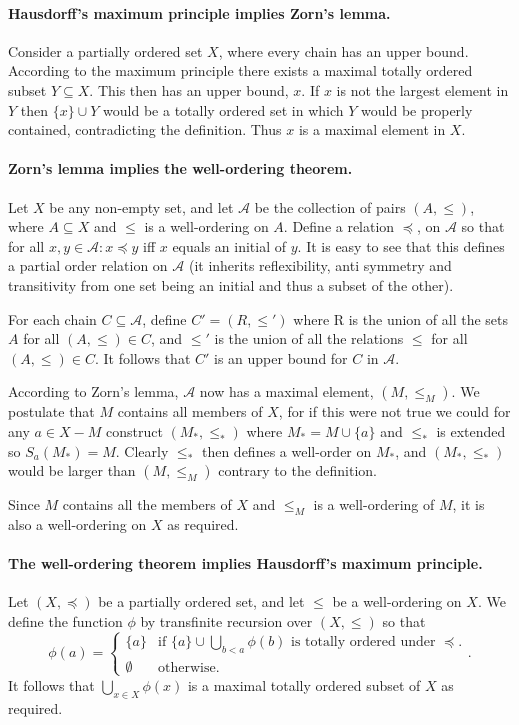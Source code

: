 \documentclass[12pt]{article}
\newcommand{\A}{\mathcal{A}}
\begin{document}
\paragraph{Hausdorff's maximum principle implies Zorn's lemma.}
Consider
a partially ordered set $X$, where every chain has an upper bound. According to the maximum principle
there exists a maximal totally ordered subset $Y\subseteq X$. This then has an upper bound, $x$. If
$x$ is not the largest element in $Y$ then $\{x\}\cup Y$ would be a totally ordered set in which $Y$
would be properly contained, contradicting the definition. Thus $x$ is a maximal element in $X$.

\paragraph{Zorn's lemma implies the well-ordering theorem.}
Let $X$ be any non-empty set, and let $\A$ be the collection of pairs $(A,\leq)$, where $A\subseteq X$
and $\leq$ is a well-ordering on $A$. Define a relation $\preceq$, on $\A$ so that for all $x,y\in\A: x\preceq y$
iff $x$ equals an initial of $y$. It is easy to see that this defines a partial order relation on $\A$
(it inherits reflexibility, anti symmetry and transitivity from one set being an initial and thus a subset of
the other).

For each chain $C\subseteq\A$, define $C'=(R,\leq')$ where R is the union of all the sets $A$
for all $(A,\leq)\in C$, and $\leq'$ is the union of all the relations $\leq$ for all $(A,\leq)\in C$.
It follows that $C'$ is an upper bound for $C$ in $\A$.

According to Zorn's lemma, $\A$ now has a maximal element, $(M,\leq_M)$. We postulate that $M$ contains all
members of $X$, for if this were not true we could for any $a\in X-M$ construct $(M_*,\leq_*)$ where
$M_*=M\cup\{a\}$ and $\leq_*$ is extended so $S_a(M_*)=M$. Clearly $\leq_*$ then defines a well-order on
$M_*$, and $(M_*,\leq_*)$ would be larger than $(M,\leq_M)$ contrary to the definition.

Since $M$ contains all the members of $X$ and $\leq_M$ is a well-ordering of $M$, it is also a
well-ordering on $X$ as required.

\paragraph{The well-ordering theorem implies Hausdorff's maximum principle.}
Let $(X,\preceq)$ be a partially ordered set, and let $\leq$ be a well-ordering on $X$. We define
the function $\phi$ by transfinite recursion over $(X,\leq)$ so that
$$\phi(a) = \begin{cases}
\{a\}         &\text{if }\{a\}\cup\bigcup_{b<a}\phi(b)\text{ is totally ordered under }\preceq.\\
\emptyset &\text{otherwise}.
\end{cases}.$$
It follows that $\bigcup_{x\in X}\phi(x)$ is a maximal totally ordered subset of $X$ as required.
\end{document}
